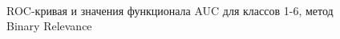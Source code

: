 \documentclass[12pt,twoside]{article}
\begin{document}
\begin{figure}[h]
	\\
	\caption{ROC-кривая и значения функционала AUC для классов 1-6, метод Binary Relevance}
	\label{fg:BR1}
\end{figure}
\end{document}
